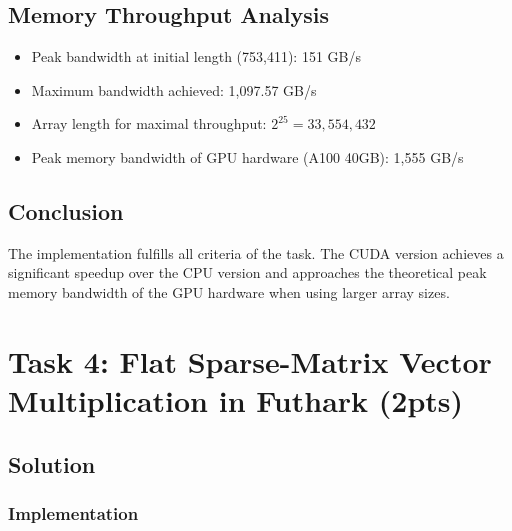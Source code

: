 \documentclass{article}
\begin{document}
\subsection{Memory Throughput Analysis}

\begin{itemize}
    \item Peak bandwidth at initial length (753,411): 151 GB/s
    \item Maximum bandwidth achieved: 1,097.57 GB/s
    \item Array length for maximal throughput: $2^{25} = 33,554,432$
    \item Peak memory bandwidth of GPU hardware (A100 40GB): 1,555 GB/s
\end{itemize}

\subsection{Conclusion}

The implementation fulfills all criteria of the task. The CUDA version achieves a significant speedup over the CPU version and approaches the theoretical peak memory bandwidth of the GPU hardware when using larger array sizes.

\section{Task 4: Flat Sparse-Matrix Vector Multiplication in Futhark (2pts)}


\subsection{Solution}

\subsubsection{Implementation}
\end{document}
